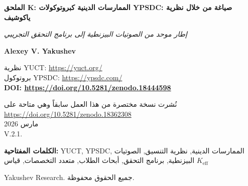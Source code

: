\documentclass[12pt,a4paper]{article}
\begin{document}
	
	\begin{titlepage}
		\begin{center}
			\vspace*{0cm}
			
			\Huge\textbf{الملحق K: الممارسات الدينية كبروتوكولات YPSDC: صياغة من خلال نظرية ياكوشيف}
			
			\vspace{1cm}
			
			\small\textit{إطار موحد من الصوتيات البيزنطية إلى برنامج التحقق التجريبي}
			
			\vspace{0.5cm}
			
			\small\textbf{Alexey V. Yakushev}
			
			\vspace{0cm}
			
			نظرية YUCT: \url{https://yuct.org/}\\
			بروتوكول YPSDC: \url{https://ypsdc.com/}\\
			
			\vspace{2cm}
			\textbf{DOI: \url{https://doi.org/10.5281/zenodo.18444598}}\\
			
			\vspace{1cm}
			
			\vspace{0cm}
			\large 
			نُشرت نسخة مختصرة من هذا العمل سابقاً وهي متاحة على\\ \url{https://doi.org/10.5281/zenodo.18362308}\\
			\vspace{1cm}
			مارس 2026 \\ \large V.2.1.
			\newpage
			\begin{abstract}
				\noindent
				يقدم هذا المستند صياغة شاملة للممارسات الدينية من خلال عدسة نظرية التنسيق الموحدة لياكوشيف (YUCT) وبروتوكول YPSDC (بروتوكول التنسيق الموزع المتزامن لياكوشيف). يوضح الجزء الأول كيف تعمل الطقوس الدينية كبروتوكولات تنسيق عالية التحسين باستخدام قواميس موزعة مسبقاً، حيث تمثل الصوتيات البيزنطية للكنائس مثالاً نموذجياً للتحسين المعماري لكفاءة التنسيق. يحدد الجزء الثاني قوة التوحيد القصوى لإطار YUCT ويقدم برنامج بحث مفصلاً للتحقق التجريبي، مع التأكيد على أبحاث الطلاب كحجر الزاوية للتحقق العلمي. يوفر الإطار مقاييس قابلة للقياس ($K_{\mathrm{eff}}$)، وتنبؤات قابلة للاختبار، وتطبيقات متعددة التخصصات من الفيزياء والبيولوجيا إلى علم الاجتماع والدراسات الدينية.
			\end{abstract}
			
			\vspace{0cm}
			
			\noindent
			\small\textbf{الكلمات المفتاحية:} YUCT, YPSDC, الممارسات الدينية, نظرية التنسيق, الصوتيات البيزنطية, برنامج التحقق, أبحاث الطلاب, متعدد التخصصات, قياس $K_{\mathrm{eff}}$
			
			\vspace{0.5cm}
			
			\noindent
			 Yakushev Research. جميع الحقوق محفوظة.
		\end{center}
	\end{titlepage}
	
\end{document}
